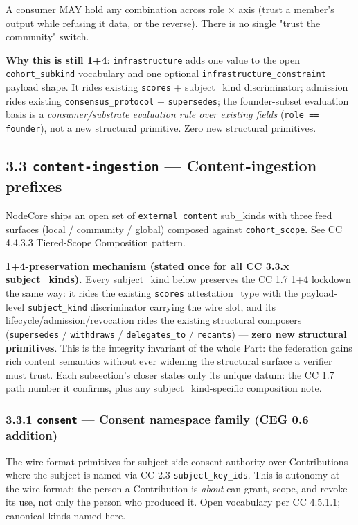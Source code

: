 \documentclass[11pt]{article}
\begin{document}
A consumer MAY hold any combination across role × axis (trust a member's output while refusing it data, or the reverse). There is no single "trust the community" switch.


\textbf{Why this is still 1+4}: \texttt{infrastructure} adds one value to the open \texttt{cohort\_subkind} vocabulary and one optional \texttt{infrastructure\_constraint} payload shape. It rides existing \texttt{scores} + subject\_kind discriminator; admission rides existing \texttt{consensus\_protocol} + \texttt{supersedes}; the founder-subset evaluation basis is a \textit{consumer/substrate evaluation rule over existing fields} (\texttt{role == founder}), not a new structural primitive. Zero new structural primitives.


\subsection*{3.3 \texttt{content-ingestion} — Content-ingestion prefixes}


NodeCore ships an open set of \texttt{external\_content} sub\_kinds with three feed surfaces (local / community / global) composed against \texttt{cohort\_scope}. See CC 4.4.3.3 Tiered-Scope Composition pattern.


\textbf{1+4-preservation mechanism (stated once for all CC 3.3.x subject\_kinds).} Every subject\_kind below preserves the CC 1.7 1+4 lockdown the same way: it rides the existing \texttt{scores} attestation\_type with the payload-level \texttt{subject\_kind} discriminator carrying the wire slot, and its lifecycle/admission/revocation rides the existing structural composers (\texttt{supersedes} / \texttt{withdraws} / \texttt{delegates\_to} / \texttt{recants}) — \textbf{zero new structural primitives}. This is the integrity invariant of the whole Part: the federation gains rich content semantics without ever widening the structural surface a verifier must trust. Each subsection's closer states only its unique datum: the CC 1.7 path number it confirms, plus any subject\_kind-specific composition note.


\subsubsection*{3.3.1 \texttt{consent} — Consent namespace family (CEG 0.6 addition)}


The wire-format primitives for subject-side consent authority over Contributions where the subject is named via CC 2.3 \texttt{subject\_key\_ids}. This is autonomy at the wire format: the person a Contribution is \textit{about} can grant, scope, and revoke its use, not only the person who produced it. Open vocabulary per CC 4.5.1.1; canonical kinds named here.
\end{document}

